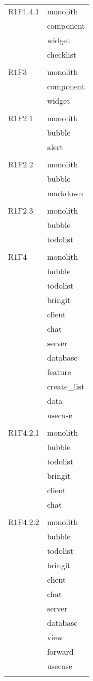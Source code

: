 \begin{center}
\begin{longtable}{|p{7cm}|p{7cm}|}
		R1F1.4.1 & monolith \\ & component \\ & widget \\ & checklist \\ & \\ \hline
		R1F3 & monolith \\ & component \\ & widget \\ & \\ \hline
		R1F2.1 & monolith \\ & bubble \\ & alert \\ & \\ \hline
		R1F2.2 & monolith \\ & bubble \\ & markdown \\ & \\ \hline
		R1F2.3 & monolith \\ & bubble \\ & todolist \\ & \\ \hline
		R1F4 & monolith \\ & bubble \\ & todolist \\ & bringit \\ & client \\ & chat \\ & server \\ & database \\ & feature \\ & create\_list \\ & data \\ & usecase \\ & \\ \hline
		R1F4.2.1 & monolith \\ & bubble \\ & todolist \\ & bringit \\ & client \\ & chat \\ & \\ \hline
		R1F4.2.2 & monolith \\ & bubble \\ & todolist \\ & bringit \\ & client \\ & chat \\ & server \\ & database \\ & view \\ & forward \\ & usecase \\ & \\ \hline

\end{longtable}
\end{center}

